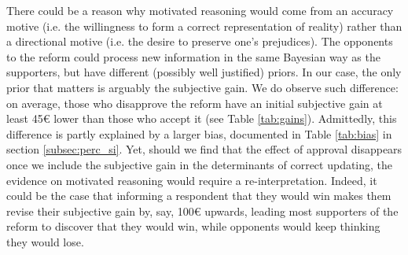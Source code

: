 \documentclass[11pt]{article}
\begin{document}
\begin{appendices}


There could be a reason why motivated reasoning would come from an accuracy motive (i.e. the willingness to form a correct representation of reality) rather than a directional motive (i.e. the desire to preserve one's prejudices). The opponents to the reform could process new information in the same Bayesian way as the supporters, but have different (possibly well justified) priors. In our case, the only prior that matters is arguably the subjective gain. We do observe such difference: on average, those who disapprove the reform have an initial subjective gain at least 45\euro{} lower than those who accept it (see Table \ref{tab:gains}). Admittedly, this difference is partly explained by a larger bias, documented in Table \ref{tab:bias} in section \ref{subsec:perc_si}. Yet, should we find that the effect of approval disappears once we include the subjective gain in the determinants of correct updating, the evidence on motivated reasoning would require a re-interpretation. Indeed, it could be the case that informing a respondent that they would win makes them revise their subjective gain by, say, 100\euro{} upwards, leading most supporters of the reform to discover that they would win, while opponents would keep thinking they would lose. %



\end{appendices}
\end{document}
